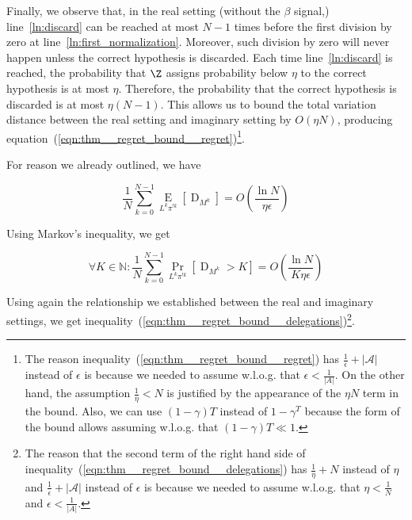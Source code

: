 \documentclass[anon,12pt]{colt2018} %
\newcommand{\AP}[1]{\left(#1\right)}
\newcommand{\AB}[1]{\left[#1\right]}
\newcommand{\Pa}[2]{\underset{#1}{\operatorname{Pr}}\AB{#2}}
\newcommand{\Ea}[2]{\underset{#1}{\operatorname{E}}\AB{#2}}
\newcommand{\Nats}{\mathbb{N}}
\newcommand{\Abs}[1]{\left\vert #1 \right\vert}
\newcommand{\A}{\mathcal{A}}
\newcommand{\ND}{\operatorname{D}}
\begin{document}
Finally, we observe that, in the real setting (without the $\beta$ signal,) line~\ref{ln:discard} can be reached at most $N-1$ times before the first division by zero at line~\ref{ln:first_normalization}. Moreover, such division by zero will never happen unless the correct hypothesis is discarded. Each time line~\ref{ln:discard} is reached, the probability that $\Z$ assigns probability below $\eta$ to the correct hypothesis is at most $\eta$. Therefore, the probability that the correct hypothesis is discarded is at most $\eta(N-1)$. This allows us to bound the total variation distance between the real setting and imaginary setting by $O(\eta N)$, producing equation~(\ref{eqn:thm__regret_bound__regret})\footnote{The reason inequality~(\ref{eqn:thm__regret_bound__regret}) has $\frac{1}{\epsilon}+\Abs{\A}$ instead of $\epsilon$ is because we needed to assume w.l.o.g. that $\epsilon < \frac{1}{\Abs{A}}$. On the other hand, the assumption $\frac{1}{\eta}<N$ is justified by the appearance of the $\eta N$ term in the bound. Also, we can use $(1-\gamma)T$ instead of $1-\gamma^T$ because the form of the bound allows assuming w.l.o.g. that $(1-\gamma)T \ll 1$.}.

For reason we already outlined, we have

\begin{equation}
\frac{1}{N}\sum_{k=0}^{N-1} \Ea{L^k\pi^{!k}}{\ND_{M^k}} = O\AP{\frac{\ln{N}}{\eta\epsilon}}
\end{equation}

Using Markov's inequality, we get

\begin{equation}
\forall K\in\Nats: \frac{1}{N}\sum_{k=0}^{N-1} \Pa{L^k\pi^{!k}}{\ND_{M^k}> K} = O\AP{\frac{\ln{N}}{K\eta\epsilon}}
\end{equation}

Using again the relationship we established between the real and imaginary settings, we get inequality~(\ref{eqn:thm__regret_bound__delegations})\footnote{The reason that the second term of the right hand side of inequality~(\ref{eqn:thm__regret_bound__delegations}) has $\frac{1}{\eta}+N$ instead of $\eta$ and $\frac{1}{\epsilon}+\Abs{\A}$ instead of $\epsilon$ is because we needed to assume w.l.o.g. that $\eta < \frac{1}{N}$ and $\epsilon < \frac{1}{\Abs{A}}$.}.






\appendix
\end{document}
